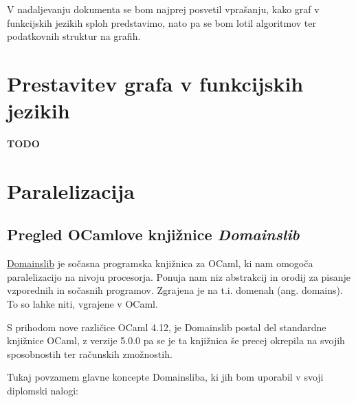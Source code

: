 \documentclass[mat1, tisk]{fmfdelo}
\begin{document}
V nadaljevanju dokumenta se bom najprej posvetil vprašanju, kako graf v funkcijskih jezikih sploh predstavimo, nato pa se bom lotil algoritmov ter podatkovnih struktur na grafih.


\section{Prestavitev grafa v funkcijskih jezikih}

\textbf{TODO}

\pagebreak

\section{Paralelizacija}

\subsection{Pregled OCamlove knjižnice \textit{Domainslib}}

\href{https://github.com/ocaml-multicore/domainslib}{Domainslib} je sočasna programska knjižnica za OCaml, 
ki nam omogoča paralelizacijo na nivoju procesorja.
Ponuja nam niz abstrakcij in orodij za pisanje vzporednih in sočasnih programov. 
Zgrajena je na t.i. domenah (ang. domains). To so lahke niti, vgrajene v OCaml.

S prihodom nove različice OCaml 4.12, je Domainslib postal del standardne knjižnice OCaml, z verzije 5.0.0 pa se je ta knjižnica
še precej okrepila na svojih sposobnostih ter računskih zmožnostih.

Tukaj povzamem glavne koncepte Domainsliba, ki jih bom uporabil v svoji diplomski nalogi:
\end{document}
